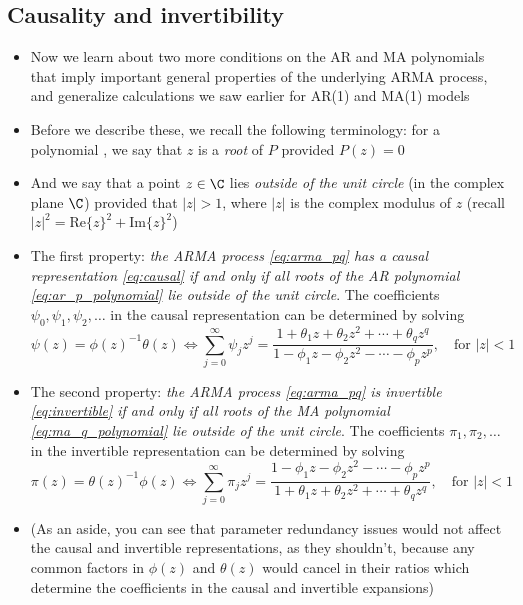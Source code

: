 \documentclass{article}
\begin{document}
\subsection{Causality and invertibility}

\begin{itemize}
\item Now we learn about two more conditions on the AR and MA polynomials that
  imply important general properties of the underlying ARMA process, and
  generalize calculations we saw earlier for AR(1) and MA(1) models

\item Before we describe these, we recall the following terminology: for a
  polynomial , we say that $z$ is a
  \emph{root} of $P$ provided $P(z) = 0$

\item And we say that a point $z \in \C$ lies \emph{outside of the unit circle} 
  (in the complex plane $\C$) provided that $|z| > 1$, where $|z|$ is the
  complex modulus of $z$ (recall $|z|^2 = \mathrm{Re}\{z\}^2 +
  \mathrm{Im}\{z\}^2$)     

\item The first property: \emph{the ARMA process \eqref{eq:arma_pq} has a causal
    representation \eqref{eq:causal} if and only if all roots of the AR
    polynomial \eqref{eq:ar_p_polynomial} lie outside of the unit circle}. The
  coefficients $\psi_0,\psi_1,\psi_2,\dots$ in the causal representation can be
  determined by solving  
  \[
  \psi(z) = \phi(z)^{-1} \theta(z) \iff 
  \sum_{j=0}^\infty \psi_j z^j = \frac{1 + \theta_1 z + \theta_2 z^2 + \cdots +
    \theta_q z^q}{1 - \phi_1 z - \phi_2 z^2 - \cdots - \phi_p z^p}, \quad
  \text{for $|z| < 1$}
  \]

\item The second property: \emph{the ARMA process \eqref{eq:arma_pq} is
    invertible \eqref{eq:invertible} if and only if all roots of the MA
    polynomial \eqref{eq:ma_q_polynomial} lie outside of the unit circle}. The  
  coefficients $\pi_1,\pi_2,\dots$ in the invertible representation can be 
  determined by solving   
  \[
  \pi(z) = \theta(z)^{-1} \phi(z) \iff 
  \sum_{j=0}^\infty \pi_j z^j = \frac{1 - \phi_1 z - \phi_2 z^2 - \cdots -
    \phi_p z^p}{1 + \theta_1 z + \theta_2 z^2 + \cdots + \theta_q z^q}, \quad 
  \text{for $|z| < 1$}
  \]

\item (As an aside, you can see that parameter redundancy issues would not
  affect the causal and invertible representations, as they shouldn't, because
  any common factors in $\phi(z)$ and $\theta(z)$ would cancel in their ratios 
  which determine the coefficients in the causal and invertible expansions)  


\end{itemize}
\end{document}
